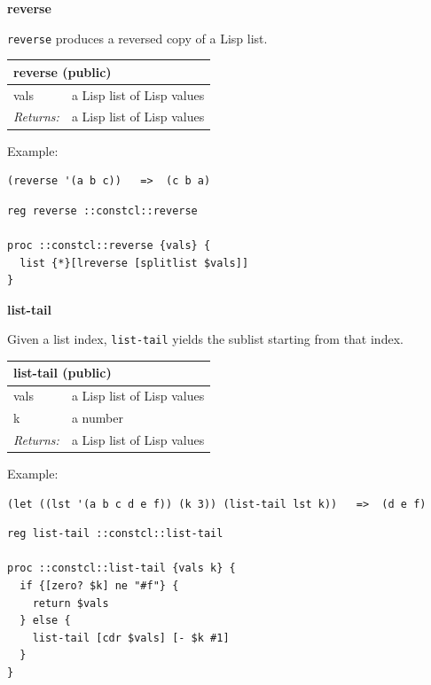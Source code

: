 \documentclass[twoside,9pt]{report}
\begin{document}
\textbf{reverse}


\texttt{reverse} produces a reversed copy of a Lisp list.

\begin{tabular}{ |l l| }
\hline
\multicolumn{2}{|l|}{reverse (public)} \\
\hline
vals & a Lisp list of Lisp values \\
\textit{Returns:} & a Lisp list of Lisp values \\
\hline
\end{tabular}


Example:

\noindent\makebox[\linewidth]{\rule{\linewidth}{0.4pt}}
\begin{lstlisting}
(reverse '(a b c))   =>  (c b a)
\end{lstlisting}
\noindent\makebox[\linewidth]{\rule{\linewidth}{0.4pt}}
\noindent\makebox[\linewidth]{\rule{\linewidth}{0.4pt}}
\begin{lstlisting}
reg reverse ::constcl::reverse
 
proc ::constcl::reverse {vals} {
  list {*}[lreverse [splitlist $vals]]
}
\end{lstlisting}
\noindent\makebox[\linewidth]{\rule{\linewidth}{0.4pt}}

\textbf{list-tail}


Given a list index, \texttt{list-tail} yields the sublist starting from that index.

\begin{tabular}{ |l l| }
\hline
\multicolumn{2}{|l|}{list-tail (public)} \\
\hline
vals & a Lisp list of Lisp values \\
k & a number \\
\textit{Returns:} & a Lisp list of Lisp values \\
\hline
\end{tabular}


Example:

\noindent\makebox[\linewidth]{\rule{\linewidth}{0.4pt}}
\begin{lstlisting}
(let ((lst '(a b c d e f)) (k 3)) (list-tail lst k))   =>  (d e f)
\end{lstlisting}
\noindent\makebox[\linewidth]{\rule{\linewidth}{0.4pt}}
\noindent\makebox[\linewidth]{\rule{\linewidth}{0.4pt}}
\begin{lstlisting}
reg list-tail ::constcl::list-tail
 
proc ::constcl::list-tail {vals k} {
  if {[zero? $k] ne "#f"} {
    return $vals
  } else {
    list-tail [cdr $vals] [- $k #1]
  }
}
\end{lstlisting}
\noindent\makebox[\linewidth]{\rule{\linewidth}{0.4pt}}
\end{document}
